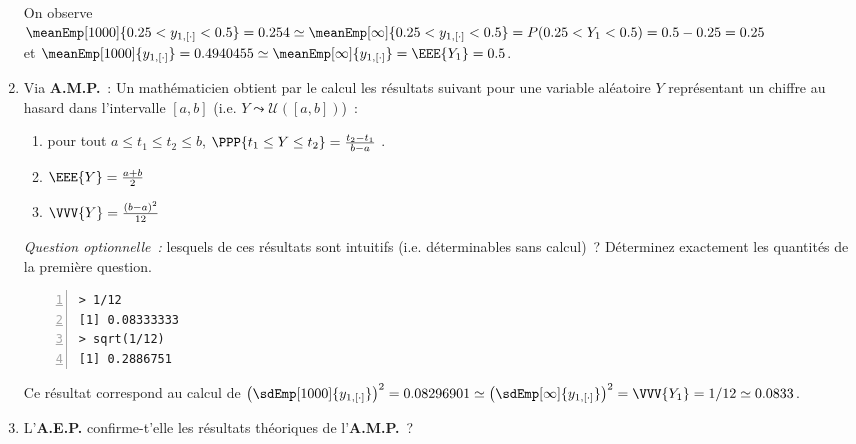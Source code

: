 \documentclass[10pt]{report}
\begin{document}
\begin{exercice}
\begin{enumerate}
\begin{Correction}
On observe\\
$\meanEmp[1000]{0.25<y_{1,[\cdot]}<0.5} =0.254 \simeq \meanEmp[\infty]{0.25<y_{1,[\cdot]}<0.5} =P(0.25<Y_1<0.5)=0.5-0.25=0.25$ \\
et
$\meanEmp[1000]{y_{1,[\cdot]}} =0.4940455 \simeq \meanEmp[\infty]{y_{1,[\cdot]}} =\EEE{Y_1}=0.5$.
\end{Correction}

\item Via \textbf{A.M.P.}~: Un mathématicien obtient par le calcul les résultats suivant pour une variable aléatoire $Y$ représentant un chiffre au hasard dans l'intervalle $[a,b]$ (i.e. $Y\leadsto\mathcal{U}([a,b])$)~: 
\begin{enumerate}
\item pour tout $a\leq t_1 \leq t_2\leq b$, $\PPP{t_1\leq Y \leq t_2}=\frac{t_2-t_1}{b-a}$ .
\item $\EEE{Y}=\frac{a+b}2$
\item $\VVV{Y}=\frac{(b-a)^2}{12}$
\end{enumerate}
\noindent \textit{Question optionnelle~:} lesquels de ces résultats sont intuitifs (i.e. déterminables sans calcul)~?
Déterminez exactement les quantités de la première question.
\begin{Verbatim}[frame=leftline,fontfamily=tt,fontshape=n,numbers=left]
> 1/12
[1] 0.08333333
> sqrt(1/12)
[1] 0.2886751
\end{Verbatim}


\begin{Correction}
Ce résultat correspond au calcul de
$\left(\sdEmp[1000]{y_{1,[\cdot]}}\right)^2 =0.08296901 \simeq \left(\sdEmp[\infty]{y_{1,[\cdot]}} \right)^2=\VVV{Y_1}=1/12\simeq 0.0833$.
\end{Correction}

\item L'\textbf{A.E.P.} confirme-t'elle les résultats théoriques de l'\textbf{A.M.P.}~?
\end{enumerate}
\end{exercice}
\end{document}
